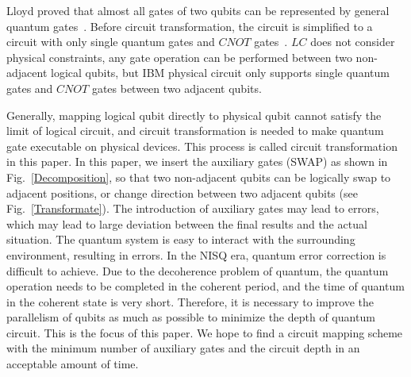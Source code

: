 \documentclass[runningheads]{llncs}
\begin{document}
Lloyd proved that almost all gates of two qubits can be represented by general quantum gates~\cite{Lloyd1995Almost}. 
Before circuit transformation, the circuit is simplified to a circuit with only single 
quantum gates and $CNOT$ gates~\cite{2005Mttnen,1995Barenco}.
 $LC$ does not consider physical constraints, 
any gate operation can be performed between two non-adjacent logical qubits, 
but IBM physical circuit only supports single quantum gates and $CNOT$ gates between two adjacent qubits. 

Generally, mapping logical qubit directly to physical qubit cannot satisfy the limit of logical circuit, 
and circuit transformation is needed to make quantum gate executable on physical devices. 
This process is called circuit transformation in this paper. In this paper, we insert the 
auxiliary gates (SWAP) as shown in Fig.~\ref{Decomposition},
so that two non-adjacent qubits can be logically swap to adjacent positions, 
or change direction between two adjacent qubits (see Fig.~\ref{Transformate}). 
The introduction of auxiliary gates may lead to errors, 
which may lead to large deviation between the final results and the actual situation. 
The quantum system is easy to interact with the surrounding environment, 
resulting in errors. In the NISQ era, quantum error correction is difficult to achieve. 
Due to the decoherence problem of quantum, the quantum operation needs to be completed in the coherent period, 
and the time of quantum in the coherent state is very short. Therefore, 
it is necessary to improve the parallelism of qubits as much as possible to minimize the depth 
of quantum circuit. This is the focus of this paper. We hope to find a circuit mapping scheme 
with the minimum number of auxiliary gates and the circuit depth in an acceptable amount of time.
\end{document}
